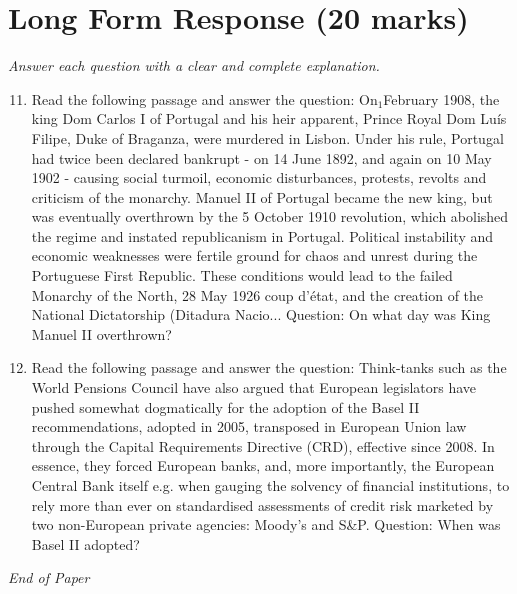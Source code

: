 \documentclass[12pt]{article}
\begin{document}
\section*{Long Form Response (20 marks)}
\textit{Answer each question with a clear and complete explanation.}
\begin{enumerate}[label=\arabic*.]
\setcounter{enumi}{10}
\item Read the following passage and answer the question: On$_{1}$February 1908, the king Dom Carlos I of Portugal and his heir apparent, Prince Royal Dom Luís Filipe, Duke of Braganza, were murdered in Lisbon. Under his rule, Portugal had twice been declared bankrupt - on 14 June 1892, and again on 10 May 1902 - causing social turmoil, economic disturbances, protests, revolts and criticism of the monarchy. Manuel II of Portugal became the new king, but was eventually overthrown by the 5 October 1910 revolution, which abolished the regime and instated republicanism in Portugal. Political instability and economic weaknesses were fertile ground for chaos and unrest during the Portuguese First Republic. These conditions would lead to the failed Monarchy of the North, 28 May 1926 coup d'état, and the creation of the National Dictatorship (Ditadura Nacio... Question: On what day was King Manuel II overthrown?
\item Read the following passage and answer the question: Think-tanks such as the World Pensions Council have also argued that European legislators have pushed somewhat dogmatically for the adoption of the Basel II recommendations, adopted in 2005, transposed in European Union law through the Capital Requirements Directive (CRD), effective since 2008. In essence, they forced European banks, and, more importantly, the European Central Bank itself e.g. when gauging the solvency of financial institutions, to rely more than ever on standardised assessments of credit risk marketed by two non-European private agencies: Moody's and S\&P. Question: When was Basel II adopted?
\end{enumerate}

\vfill
\noindent\textit{End of Paper}
\end{document}
